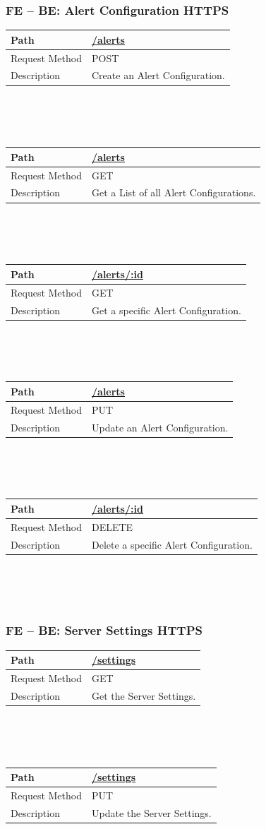 \documentclass{scrreprt}
\begin{document}
\subsubsection{FE -- BE: Alert Configuration HTTPS}
\begin{tabularx}{12cm}{l|l}
	Path & \url{/alerts} \\\hline
	Request Method & POST \\\hline
	Description & Create an Alert Configuration.
\end{tabularx}
\\
\\ \\
\begin{tabularx}{12cm}{l|l}
	Path & \url{/alerts} \\\hline
	Request Method & GET \\\hline
	Description & Get a List of all Alert Configurations.
\end{tabularx}
\\
\\ \\
\begin{tabularx}{12cm}{l|l}
	Path & \url{/alerts/:id} \\\hline
	Request Method & GET \\\hline
	Description & Get a specific Alert Configuration.
\end{tabularx}
\\
\\ \\
\begin{tabularx}{12cm}{l|l}
	Path & \url{/alerts} \\\hline
	Request Method & PUT \\\hline
	Description & Update an Alert Configuration.
\end{tabularx}
\\
\\ \\
\begin{tabularx}{12cm}{l|l}
	Path & \url{/alerts/:id} \\\hline
	Request Method & DELETE \\\hline
	Description & Delete a specific Alert Configuration.
\end{tabularx}
\\
\\ \\
\subsubsection{FE -- BE: Server Settings HTTPS}
\begin{tabularx}{12cm}{l|l}
	Path & \url{/settings} \\\hline
	Request Method & GET \\\hline
	Description & Get the Server Settings.
\end{tabularx}
\\
\\ \\
\begin{tabularx}{12cm}{l|l}
	Path & \url{/settings} \\\hline
	Request Method & PUT \\\hline
	Description & Update the Server Settings.
\end{tabularx}
\end{document}
